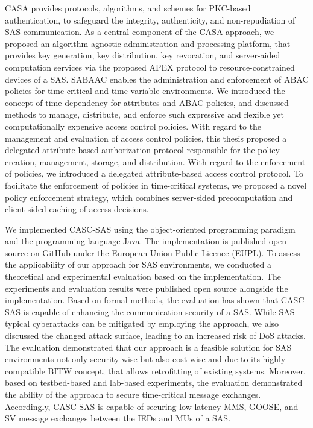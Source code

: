 CASA provides protocols, algorithms, and schemes for PKC-based authentication, to safeguard the integrity, authenticity, and non-repudiation of SAS communication.
As a central component of the CASA approach, we proposed an algorithm-agnostic administration and processing platform, that provides key generation, key distribution, key revocation, and server-aided computation services via the proposed APEX protocol to resource-constrained devices of a SAS.
SABAAC enables the administration and enforcement of ABAC policies for time-critical and time-variable environments.
We introduced the concept of time-dependency for attributes and ABAC policies, and discussed methods to manage, distribute, and enforce such expressive and flexible yet computationally expensive access control policies.
With regard to the management and evaluation of access control policies, this thesis proposed a delegated attribute-based authorization protocol responsible for the policy creation, management, storage, and distribution.
With regard to the enforcement of policies, we introduced a delegated attribute-based access control protocol.
To facilitate the enforcement of policies in time-critical systems, we proposed a novel policy enforcement strategy, which combines server-sided precomputation and client-sided caching of access decisions.

We implemented CASC-SAS using the object-oriented programming paradigm and the programming language Java.
The implementation is published open source on GitHub under the European Union Public Licence (EUPL).
To assess the applicability of our approach for SAS environments, we conducted a theoretical and experimental evaluation based on the implementation.
The experiments and evaluation results were published open source alongside the implementation.
Based on formal methods, the evaluation has shown that CASC-SAS is capable of enhancing the communication security of a SAS.
While SAS-typical cyberattacks can be mitigated by employing the approach, we also discussed the changed attack surface, leading to an increased risk of DoS attacks.
The evaluation demonstrated that our approach is a feasible solution for SAS environments not only security-wise but also cost-wise and due to its highly-compatible BITW concept, that allows retrofitting of existing systems.
Moreover, based on testbed-based and lab-based experiments, the evaluation demonstrated the ability of the approach to secure time-critical message exchanges.
Accordingly, CASC-SAS is capable of securing low-latency MMS, GOOSE, and SV message exchanges between the IEDs and MUs of a SAS.

